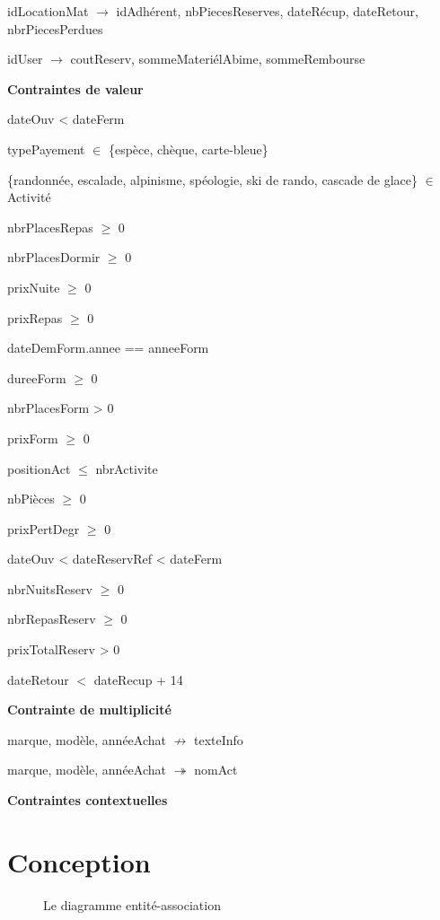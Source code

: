 \documentclass[12pt, a4paper]{article}
\begin{document}
idLocationMat $\rightarrow$ idAdhérent, nbPiecesReserves, dateRécup, dateRetour, nbrPiecesPerdues

idUser $\rightarrow$ coutReserv, sommeMateriélAbime, sommeRembourse

\textbf{Contraintes de valeur}

dateOuv < dateFerm

typePayement $\in$ \{espèce, chèque, carte-bleue\}

\{randonnée, escalade, alpinisme, spéologie, ski de rando, cascade de glace\} $\in$ Activité

nbrPlacesRepas $\geq$ 0

nbrPlacesDormir $\geq$ 0

prixNuite $\geq$ 0

prixRepas $\geq$ 0

dateDemForm.annee == anneeForm

dureeForm $\geq$ 0

nbrPlacesForm > 0

prixForm $\geq$ 0

positionAct $\leq$ nbrActivite

nbPièces $\geq$ 0

prixPertDegr $\geq$ 0

dateOuv < dateReservRef < dateFerm

nbrNuitsReserv $\geq$ 0

nbrRepasReserv $\geq$ 0

prixTotalReserv > 0

dateRetour $<$ dateRecup + 14

\textbf{Contrainte de multiplicité}

marque, modèle, annéeAchat $\not\rightarrow$ texteInfo

marque, modèle, annéeAchat $\twoheadrightarrow$ nomAct

\textbf{Contraintes contextuelles}

\section{Conception}
\begin{figure}[h]

\caption{Le diagramme entité-association}
\end{figure}
\end{document}
